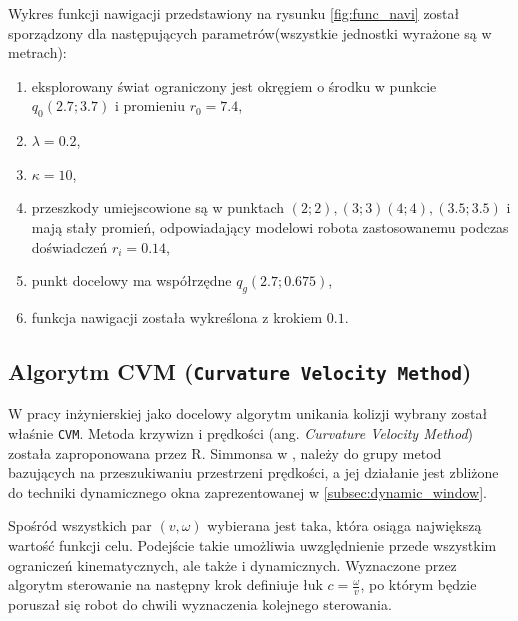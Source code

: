 	Wykres funkcji nawigacji przedstawiony na rysunku \ref{fig:func_navi} został sporządzony dla następujących parametrów(wszystkie jednostki wyrażone są w metrach):
	\begin{enumerate}
	\item eksplorowany świat ograniczony jest okręgiem o środku w punkcie $q_0(2.7;3.7)$ i promieniu $r_0 = 7.4$,
	\item $\lambda = 0.2$,
	\item $\kappa = 10$,
	\item przeszkody umiejscowione są w punktach $(2;2),(3;3)(4;4),(3.5;3.5)$ i mają stały promień, odpowiadający modelowi robota
	zastosowanemu podczas doświadczeń $r_i = 0.14 $,
	\item punkt docelowy ma współrzędne $q_g(2.7;0.675)$,
	\item funkcja nawigacji została wykreślona z krokiem $0.1$.
	\end{enumerate}

\subsection{Algorytm CVM (\texttt{Curvature Velocity Method})}
	W pracy inżynierskiej \cite{inzynierka} jako docelowy algorytm unikania kolizji wybrany został właśnie \texttt{CVM}.
	Metoda krzywizn i prędkości (ang. \textit{Curvature Velocity Method}) została zaproponowana przez R. Simmonsa w
	\cite{CVM_2}, należy do grupy metod bazujących na przeszukiwaniu przestrzeni prędkości, a jej działanie
	jest zbliżone do techniki dynamicznego okna zaprezentowanej w \ref{subsec:dynamic_window}.

	Spośród wszystkich par $(v,\omega)$ wybierana jest taka, która osiąga największą wartość funkcji celu.
	Podejście takie umożliwia uwzględnienie przede wszystkim ograniczeń kinematycznych, ale także i dynamicznych.
	Wyznaczone przez algorytm sterowanie na następny krok definiuje łuk $c=\frac{\omega}{v}$, po którym będzie
	poruszał się robot do chwili wyznaczenia kolejnego sterowania.
	
